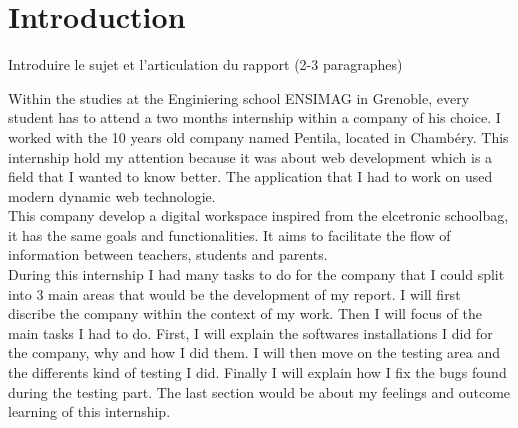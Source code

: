 
\section*{Introduction}
Introduire le sujet et l’articulation du rapport (2-3 paragraphes)

Within the studies at the Enginiering school ENSIMAG in Grenoble, every student has
to attend a two months internship within a company of his choice.
I worked with the 10 years old company named Pentila, located in Chambéry. 
This internship hold my attention because it was about web development which is a field 
that I wanted to know better. The application that I had to work on used modern
dynamic web technologie. \\  


This company develop a digital workspace inspired from the elcetronic schoolbag, it has
the same goals and functionalities. It aims to facilitate the flow of information between 
teachers, students and parents. \\

During this internship I had many tasks to do for the company that I could split into 3 main
areas that would be the development of my report.  
I will first discribe the company within the context of my work.
Then I will focus of the main tasks I had to do. First, I will explain the softwares 
installations I did for the company, why and how I did them. I will then move on the testing
area and the differents kind of testing I did. Finally I will explain how I fix the bugs 
found during the testing part. The last section would be about my feelings and outcome
learning of this internship.  
